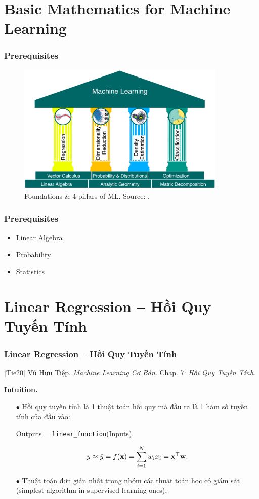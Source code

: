 \documentclass{beamer}
\begin{document}
\section{Basic Mathematics for Machine Learning}

\begin{frame}
	\frametitle{Prerequisites}
	\begin{figure}[H]
		\centering
		\includegraphics[width=10cm]{4_ML_pillars}
		\caption{Foundations \& 4 pillars of ML. Source: \cite[Fig. 1.1, p. 14]{Deisenroth_Faisal_Ong2023}.}
	\end{figure}
	
\end{frame}

\begin{frame}
	\frametitle{Prerequisites}
	\begin{itemize}
		\item Linear Algebra
		\item Probability
		\item Statistics
	\end{itemize}
\end{frame}

\section{Linear Regression -- Hồi Quy Tuyến Tính}

\begin{frame}
	\frametitle{Linear Regression -- Hồi Quy Tuyến Tính}
	[Tie20] {\sc Vũ Hữu Tiệp}. {\it Machine Learning Cơ Bản}. Chap. 7: {\it Hồi Quy Tuyến Tính}.
	
	{\bf Intuition.}
	\begin{itemize}
		\item[$\bullet$] Hồi quy tuyến tính là 1 thuật toán hồi quy mà đầu ra là 1 hàm số tuyến tính của đầu vào:
		\begin{center}
			Outputs = {\tt linear\_function}(Inputs).
		\end{center}
		\begin{equation*}
			y\approx\hat{y} = f({\bf x}) = \sum_{i=1}^N w_ix_i = {\bf x}^\top{\bf w}.
		\end{equation*}		
		\item[$\bullet$] Thuật toán đơn giản nhất trong nhóm các thuật toán học có giám sát (simplest algorithm in supervised learning ones).
	\end{itemize}
\end{frame}
\end{document}

